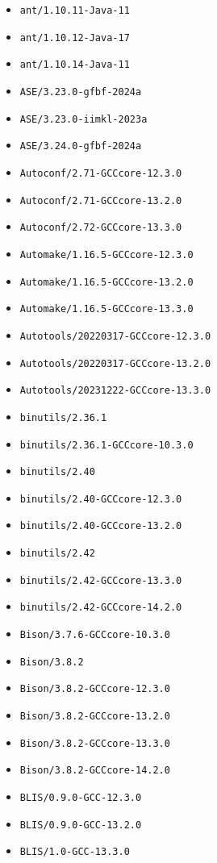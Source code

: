 \scriptsize
\begin{multicols}{3}
\begin{itemize}
\item \verb|ant/1.10.11-Java-11|
\item \verb|ant/1.10.12-Java-17|
\item \verb|ant/1.10.14-Java-11|
\item \verb|ASE/3.23.0-gfbf-2024a|
\item \verb|ASE/3.23.0-iimkl-2023a|
\item \verb|ASE/3.24.0-gfbf-2024a|
\item \verb|Autoconf/2.71-GCCcore-12.3.0|
\item \verb|Autoconf/2.71-GCCcore-13.2.0|
\item \verb|Autoconf/2.72-GCCcore-13.3.0|
\item \verb|Automake/1.16.5-GCCcore-12.3.0|
\item \verb|Automake/1.16.5-GCCcore-13.2.0|
\item \verb|Automake/1.16.5-GCCcore-13.3.0|
\item \verb|Autotools/20220317-GCCcore-12.3.0|
\item \verb|Autotools/20220317-GCCcore-13.2.0|
\item \verb|Autotools/20231222-GCCcore-13.3.0|
\item \verb|binutils/2.36.1|
\item \verb|binutils/2.36.1-GCCcore-10.3.0|
\item \verb|binutils/2.40|
\item \verb|binutils/2.40-GCCcore-12.3.0|
\item \verb|binutils/2.40-GCCcore-13.2.0|
\item \verb|binutils/2.42|
\item \verb|binutils/2.42-GCCcore-13.3.0|
\item \verb|binutils/2.42-GCCcore-14.2.0|
\item \verb|Bison/3.7.6-GCCcore-10.3.0|
\item \verb|Bison/3.8.2|
\item \verb|Bison/3.8.2-GCCcore-12.3.0|
\item \verb|Bison/3.8.2-GCCcore-13.2.0|
\item \verb|Bison/3.8.2-GCCcore-13.3.0|
\item \verb|Bison/3.8.2-GCCcore-14.2.0|
\item \verb|BLIS/0.9.0-GCC-12.3.0|
\item \verb|BLIS/0.9.0-GCC-13.2.0|
\item \verb|BLIS/1.0-GCC-13.3.0|

\end{itemize}
\end{multicols}
